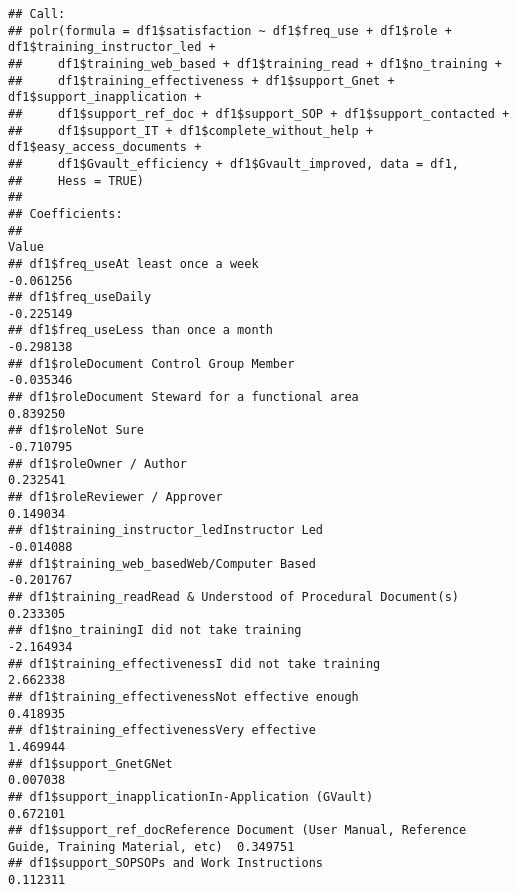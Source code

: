 \documentclass[
]{article}
\begin{document}
\begin{verbatim}
## Call:
## polr(formula = df1$satisfaction ~ df1$freq_use + df1$role + df1$training_instructor_led + 
##     df1$training_web_based + df1$training_read + df1$no_training + 
##     df1$training_effectiveness + df1$support_Gnet + df1$support_inapplication + 
##     df1$support_ref_doc + df1$support_SOP + df1$support_contacted + 
##     df1$support_IT + df1$complete_without_help + df1$easy_access_documents + 
##     df1$Gvault_efficiency + df1$Gvault_improved, data = df1, 
##     Hess = TRUE)
## 
## Coefficients:
##                                                                                                  Value
## df1$freq_useAt least once a week                                                             -0.061256
## df1$freq_useDaily                                                                            -0.225149
## df1$freq_useLess than once a month                                                           -0.298138
## df1$roleDocument Control Group Member                                                        -0.035346
## df1$roleDocument Steward for a functional area                                                0.839250
## df1$roleNot Sure                                                                             -0.710795
## df1$roleOwner / Author                                                                        0.232541
## df1$roleReviewer / Approver                                                                   0.149034
## df1$training_instructor_ledInstructor Led                                                    -0.014088
## df1$training_web_basedWeb/Computer Based                                                     -0.201767
## df1$training_readRead & Understood of Procedural Document(s)                                  0.233305
## df1$no_trainingI did not take training                                                       -2.164934
## df1$training_effectivenessI did not take training                                             2.662338
## df1$training_effectivenessNot effective enough                                                0.418935
## df1$training_effectivenessVery effective                                                      1.469944
## df1$support_GnetGNet                                                                          0.007038
## df1$support_inapplicationIn-Application (GVault)                                              0.672101
## df1$support_ref_docReference Document (User Manual, Reference Guide, Training Material, etc)  0.349751
## df1$support_SOPSOPs and Work Instructions                                                     0.112311

\end{verbatim}
\end{document}
